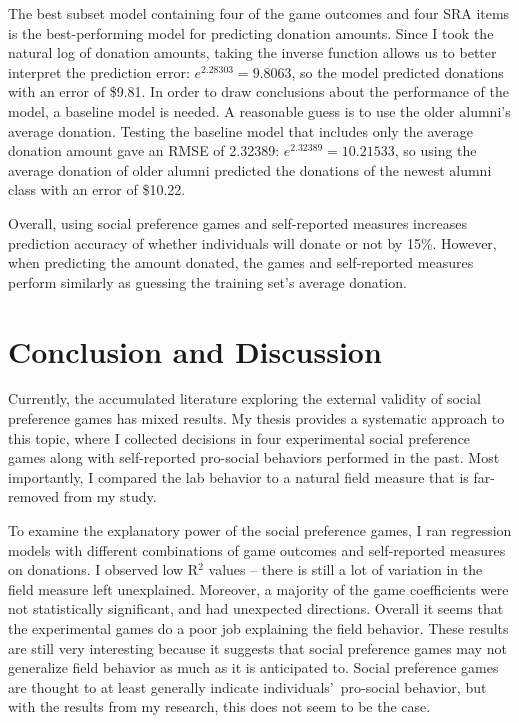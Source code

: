 \documentclass[12pt]{article}
\begin{document}
\vspace{6mm} The best subset model containing four of the game outcomes and four SRA items is the best-performing model for predicting donation amounts. Since I took the natural log of donation amounts, taking the inverse function allows us to better interpret the prediction error: \(e^{2.28303} = 9.8063\), so the model predicted donations with an error of \$9.81. In order to draw conclusions about the performance of the model, a baseline model is needed. A reasonable guess is to use the older alumni\rq s average donation. Testing the baseline model that includes only the average donation amount gave an RMSE of 2.32389: \(e^{2.32389} = 10.21533\), so using the average donation of older alumni predicted the donations of the newest alumni class with an error of \$10.22. 

Overall, using social preference games and self-reported measures increases prediction accuracy of whether individuals will donate or not by 15\%. However, when predicting the amount donated, the games and self-reported measures perform similarly as guessing the training set\rq s average donation.


\section{Conclusion and Discussion}

Currently, the accumulated literature exploring the external validity of social preference games has mixed results. My thesis provides a systematic approach to this topic, where I collected decisions in four experimental social preference games along with self-reported pro-social behaviors performed in the past. Most importantly, I compared the lab behavior to a natural field measure that is far-removed from my study.

To examine the explanatory power of the social preference games, I ran regression models with different combinations of game outcomes and self-reported measures on donations. I observed low R$^{2}$ values -- there is still a lot of variation in the field measure left unexplained. Moreover, a majority of the game coefficients were not statistically significant, and had unexpected directions. Overall it seems that the experimental games do a poor job explaining the field behavior. These results are still very interesting because it suggests that social preference games may not generalize field behavior as much as it is anticipated to. Social preference games are thought to at least generally indicate individuals\rq \ pro-social behavior, but with the results from my research, this does not seem to be the case.
\end{document}
